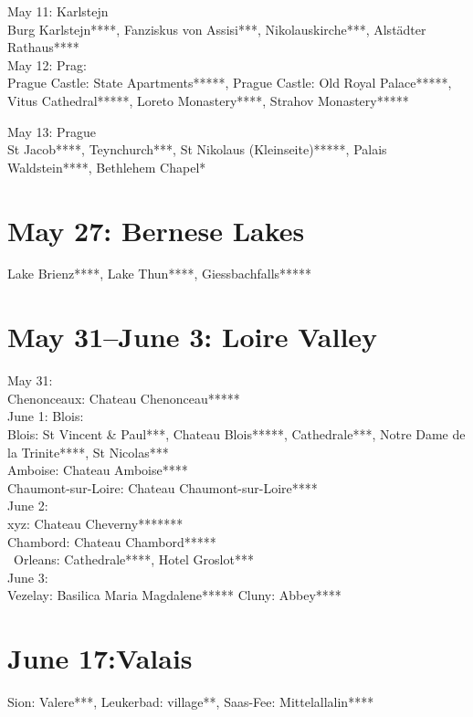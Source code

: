 May 11: Karlstejn\\
Burg Karlstejn****, Fanziskus von Assisi***, Nikolauskirche***, Alst\"adter Rathaus****\\

May 12: Prag:\\
Prague Castle: State Apartments*****, Prague Castle: Old Royal Palace*****, Vitus Cathedral*****, Loreto Monastery****, Strahov Monastery*****

May 13: Prague\\
St Jacob****, Teynchurch***, St Nikolaus (Kleinseite)*****, Palais Waldstein****, Bethlehem Chapel*

\section{May 27: Bernese Lakes}
\label{Brienz2012}

Lake Brienz****, Lake Thun****, Giessbachfalls*****

\section{May 31--June 3: Loire Valley}
\label{2012Loire}

May 31:\\
Chenonceaux: Chateau Chenonceau*****\\

June 1: Blois:\\
Blois: St Vincent \& Paul***, Chateau Blois*****, Cathedrale***, Notre Dame de la Trinite****, St Nicolas***\\
Amboise: Chateau Amboise****\\
Chaumont-sur-Loire: Chateau Chaumont-sur-Loire****\\

June 2:\\
xyz: Chateau Cheverny*******\\
Chambord: Chateau Chambord*****\\\
Orleans: Cathedrale****, Hotel Groslot***\\

June 3:\\
Vezelay: Basilica Maria Magdalene*****
Cluny: Abbey****

\section{June 17:Valais}
\label{Valais2012}

Sion: Valere***, Leukerbad: village**, Saas-Fee: Mittelallalin****

